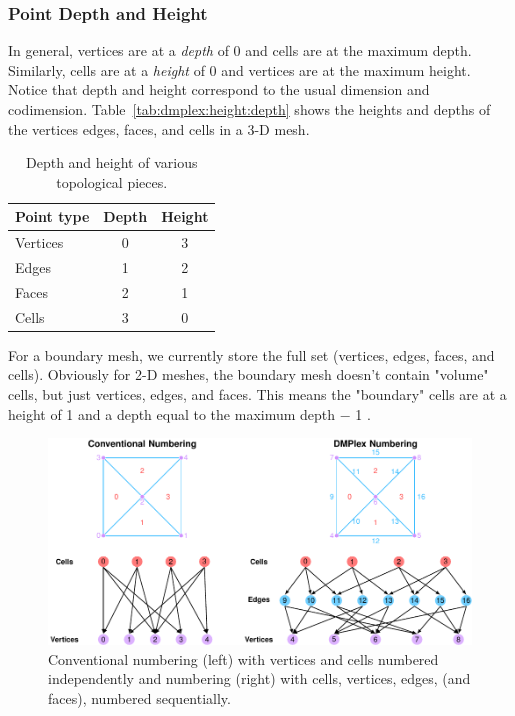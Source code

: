 \subsubsection{Point Depth and Height}

In general, vertices are at a \textit{depth} of 0 and cells are at the
maximum depth. Similarly, cells are at a \textit{height} of 0 and
vertices are at the maximum height. Notice that depth and height
correspond to the usual dimension and
codimension. Table~\vref{tab:dmplex:height:depth} shows the heights
and depths of the vertices edges, faces, and cells in a 3-D mesh.

\begin{table}[htbp]
  \caption{Depth and height of various topological pieces.}
  \label{tab:dmplex:height:depth}
  \begin{center}
    \begin{tabular}{lcc}
      \hline
      Point type & Depth & Height \\
      \hline
      Vertices  &  0  &  3 \\
      Edges  &  1  &  2 \\
      Faces  &  2  &  1 \\
      Cells  &  3  &  0 \\
      \hline
    \end{tabular}
  \end{center}
\end{table}

For a boundary mesh, we currently store the full set (vertices, edges,
faces, and cells). Obviously for 2-D meshes, the boundary mesh doesn't
contain "volume" cells, but just vertices, edges, and faces. This
means the "boundary" cells are at a height of 1 and a depth equal to
the maximum depth $-$ 1 .

\begin{figure}
  \includegraphics{developer/figs/meshtopology}
  \caption{Conventional numbering (left) with vertices and cells numbered independently and  numbering (right)
  with cells, vertices, edges, (and faces), numbered sequentially.}
  \label{fig:developer:mesh:topology}
\end{figure}

